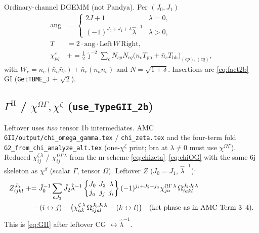 \documentclass[enabledeprecatedfontcommands]{scrartcl}
\newcommand{\codename}[1]{\texttt{#1}}
\newcommand{\sixj}[6]{\begingroup\setlength{\arraycolsep}{0.2em}%
  \begin{Bmatrix} #1 & #2 & #3 \\ #4 & #5 & #6 \end{Bmatrix}\endgroup}
\begin{document}
Ordinary-channel DGEMM (not Pandya). Per $(J_0,J_1)$
\begin{equation}\label{eq:js-chie}
\begin{aligned}
\mathrm{ang}
&=
\begin{cases}
2J+1 & \lambda=0,\\
(-1)^{J_0+J_1+\lambda}\hat\lambda^{-1} & \lambda>0,
\end{cases}
\\
T&=2\cdot\mathrm{ang}\cdot\mathrm{Left}\,W\,\mathrm{Right},\\
\chi^\varepsilon_{pq}
&\mathrel{+}=
\tfrac12\,\hat\jmath^{-2}
\sum_c N_{cp}N_{cq}
\bigl(n_c T_{\mathrm{pp}}+\bar n_c T_{\mathrm{hh}}\bigr)_{(cp),(cq)},
\end{aligned}
\end{equation}
with $W_c=n_c(\bar n_a\bar n_b)+\bar n_c(n_a n_b)$ and
$N=\sqrt{1+\delta}$. Insertions are \eqref{eq:fact2b} GI
(\codename{GetTBME\_J} $+$ $\sqrt2$).

\subsection{$\Gamma^{\mathrm{II}}$ / $\chi^{\Omega\Gamma},\chi^\zeta$
(\codename{use\_TypeGII\_2b})}
\label{sec:js-GII}

Leftover uses \emph{two} tensor 1b intermediates. AMC
\codename{GII/output/chi\_omega\_gamma.tex} /
\codename{chi\_zeta.tex} and the four-term fold
\codename{G2\_from\_chi\_analyze\_alt.tex}
(one-$\chi^\zeta$ print; bra at $\lambda\neq0$ must use $\chi^{\Omega\Gamma}$).
Reduced $\chi^{\zeta\,\lambda}_{ij}$ / $\chi^{\Omega\Gamma\,\lambda}_{ij}$
from the m-scheme \eqref{eq:chizeta}--\eqref{eq:chiOG} with the same 6j
skeleton as $\chi^\beta$ (scalar $\Gamma$, tensor $\Omega$).
Leftover $Z$ ($J_0=J_1$, $\hat\lambda^{-1}$):
\begin{equation}\label{eq:js-GII}
\begin{aligned}
Z^{J_0}_{ijkl}
&\mathrel{+}=
\hat J_0^{-1}
\sum_{a J_2}
\hat J_2\hat\lambda^{-1}
\sixj{J_0}{J_2}{\lambda}{j_a}{j_j}{j_i}
(-1)^{j_i+J_2+j_a}
\chi^{\Omega\Gamma\,\lambda}_{ja}\,
\Omega^{J_2 J_0\lambda}_{iakl}
\\
&\quad
-(i\leftrightarrow j)
-\bigl(\chi^{\zeta\,\lambda}_{ak}\,\Omega^{J_0 J_2\lambda}_{ijal}
-(k\leftrightarrow l)\bigr)
\quad\text{(ket phase as in AMC Term 3--4)}.
\end{aligned}
\end{equation}
This is \eqref{eq:GII} after leftover CG $\leftrightarrow\hat\lambda^{-1}$.
\end{document}
